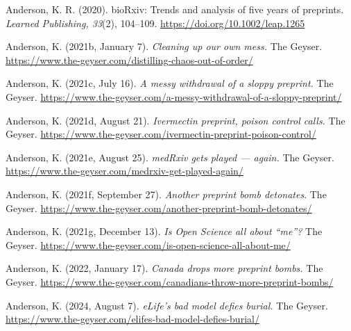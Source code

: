\documentclass[authordate, empirical]{jote-new-article}
\begin{document}
	Anderson, K. R. (2020). bioRxiv: Trends and analysis of five years of preprints. \emph{Learned Publishing, 33}(2), 104--109. \url{https://doi.org/10.1002/leap.1265}







	Anderson, K. (2021b, January 7). \emph{Cleaning up our own mess. }The Geyser. \url{https://www.the-geyser.com/distilling-chaos-out-of-order/}







	Anderson, K. (2021c, July 16). \emph{A messy withdrawal of a sloppy preprint.} The Geyser. \url{https://www.the-geyser.com/a-messy-withdrawal-of-a-sloppy-preprint/}







	Anderson, K. (2021d, August 21). \emph{Ivermectin preprint, poison control calls. }The Geyser. \url{https://www.the-geyser.com/ivermectin-preprint-poison-control/}







	Anderson, K. (2021e, August 25). \emph{medRxiv gets played — again. }The Geyser. \url{https://www.the-geyser.com/medrxiv-get-played-again/}







	Anderson, K. (2021f, September 27). \emph{Another preprint bomb detonates}. The Geyser. \url{https://www.the-geyser.com/another-preprint-bomb-detonates/}







	Anderson, K. (2021g, December 13). \emph{Is Open Science all about “me”?} The Geyser. \url{https://www.the-geyser.com/is-open-science-all-about-me/}







	Anderson, K. (2022, January 17). \emph{Canada drops more preprint bombs.} The Geyser. \url{https://www.the-geyser.com/canadians-throw-more-preprint-bombs/}







	Anderson, K. (2024, August 7). \emph{eLife's bad model defies burial.} The Geyser. \url{https://www.the-geyser.com/elifes-bad-model-defies-burial/}
\end{document}
